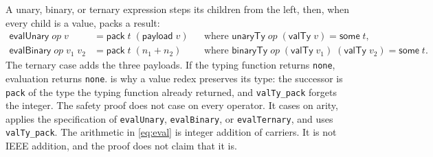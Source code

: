\documentclass[a4paper,UKenglish,anonymous,cleveref,autoref]{lipics-v2021}
\begin{document}
A unary, binary, or ternary expression steps its children from the left, then, when every child is a value, packs a result:
\begin{equation}
\label{eq:eval}
\begin{aligned}
\mathsf{evalUnary}\;\mathit{op}\;v
&= \mathsf{pack}\;t\;(\mathsf{payload}\;v)
&&\text{where }\mathsf{unaryTy}\;\mathit{op}\;(\mathsf{valTy}\;v) = \mathsf{some}\;t, \\
\mathsf{evalBinary}\;\mathit{op}\;v_1\;v_2
&= \mathsf{pack}\;t\;(n_1 + n_2)
&&\text{where }\mathsf{binaryTy}\;\mathit{op}\;(\mathsf{valTy}\;v_1)\;(\mathsf{valTy}\;v_2) = \mathsf{some}\;t.
\end{aligned}
\end{equation}
The ternary case adds the three payloads.
If the typing function returns \texttt{none}, evaluation returns \texttt{none}.
 is why a value redex preserves its type: the successor is \texttt{pack} of the type the typing function already returned, and \texttt{valTy\_pack} forgets the integer.
The safety proof does not case on every operator.
It cases on arity, applies the specification of \texttt{evalUnary}, \texttt{evalBinary}, or \texttt{evalTernary}, and uses \texttt{valTy\_pack}.
The arithmetic in \cref{eq:eval} is integer addition of carriers.
It is not IEEE addition, and the proof does not claim that it is.
\end{document}
